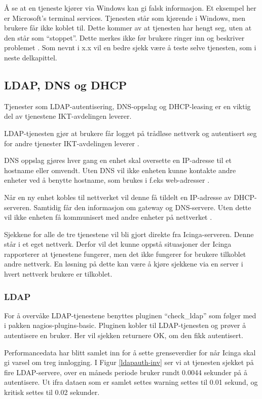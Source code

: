 Å se at en tjeneste kjører via Windows kan gi falsk informasjon. Et eksempel her er Microsoft's terminal services. Tjenesten står som kjørende i Windows, men brukere får ikke koblet til. Dette kommer av at tjenesten har hengt seg, uten at den står som “stoppet”. Dette merkes ikke før brukere ringer inn og beskriver problemet \cite{serviceproblem}. Som nevnt i x.x vil en bedre sjekk være å teste selve tjenesten, som i neste delkapittel.

\subsection{LDAP, DNS og DHCP}

Tjenester som LDAP-autentisering, DNS-oppslag og DHCP-leasing er en viktig del av tjenestene IKT-avdelingen leverer.

LDAP-tjenesten gjør at brukere får logget på trådløse nettverk og autentisert seg for andre tjenester IKT-avdelingen leverer \cite{ldap}.

DNS oppslag gjøres hver gang en enhet skal oversette en IP-adresse til et hostname eller omvendt. Uten DNS vil ikke enheten kunne kontakte andre enheter ved å benytte hostname, som brukes i f.eks web-adresser \cite{dns}. 

Når en ny enhet kobles til nettverket vil denne få tildelt en IP-adresse av DHCP-serveren. Samtidig får den informasjon om gateway og DNS-servere. Uten dette vil ikke enheten få kommunisert med andre enheter på nettverket \cite{dhcp}.

Sjekkene for alle de tre tjenestene vil bli gjort direkte fra Icinga-serveren. Denne står i et eget nettverk. Derfor vil det kunne oppstå situasjoner der Icinga rapporterer at tjenestene fungerer, men det ikke fungerer for brukere tilkoblet andre nettverk. En løsning på dette kan være å kjøre sjekkene via en server i hvert nettverk brukere er tilkoblet.


\subsubsection*{LDAP}

For å overvåke LDAP-tjenestene benyttes pluginen “check\_ldap” som følger med i pakken nagios-plugins-basic. Pluginen kobler til LDAP-tjenesten og prøver å autentisere en bruker. Her vil sjekken returnere OK, om den fikk autentisert. 

Performancedata har blitt samlet inn for å sette grenseverdier for når Icinga skal gi varsel om treg innlogging. I Figur \ref{ldapauth-inv} ser vi at tjenesten sjekket på fire LDAP-servere, over en måneds periode bruker rundt 0.0044 sekunder på å autentisere. Ut ifra dataen som er samlet settes warning settes til 0.01 sekund, og kritisk settes til 0.02 sekunder.

